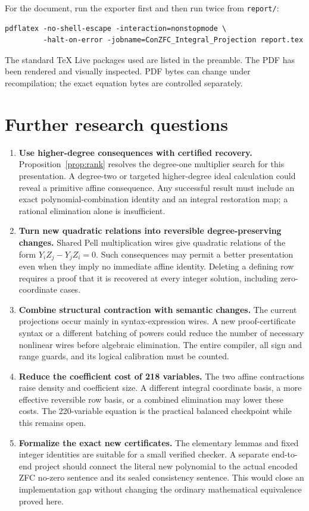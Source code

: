\documentclass[10pt,letterpaper]{article}
\theoremstyle{definition}\newtheorem{definition}[theorem]{Definition}
\begin{document}
For the document, run the exporter first and then run twice from
\texttt{report/}:
\begin{verbatim}
pdflatex -no-shell-escape -interaction=nonstopmode \
         -halt-on-error -jobname=ConZFC_Integral_Projection report.tex
\end{verbatim}
The standard TeX Live packages used are listed in the preamble. The PDF
has been rendered and visually inspected. PDF bytes can change under
recompilation; the exact equation bytes are controlled separately.

\section{Further research questions}
\label{sec:future}

\begin{enumerate}
\item \textbf{Use higher-degree consequences with certified recovery.}
Proposition~\ref{prop:rank} resolves the degree-one multiplier search for
this presentation. A degree-two or targeted higher-degree ideal calculation
could reveal a primitive affine consequence. Any successful result must
include an exact polynomial-combination identity and an integral restoration
map; a rational elimination alone is insufficient.

\item \textbf{Turn new quadratic relations into reversible degree-preserving
changes.} Shared Pell multiplication wires give quadratic relations of the
form $Y_iZ_j-Y_jZ_i=0$. Such consequences may permit a better presentation
even when they imply no immediate affine identity. Deleting a defining row
requires a proof that it is recovered at every integer solution, including
zero-coordinate cases.

\item \textbf{Combine structural contraction with semantic changes.}
The current projections occur mainly in syntax-expression wires. A new
proof-certificate syntax or a different batching of powers could reduce the
number of necessary nonlinear wires before algebraic elimination. The
entire compiler, all sign and range guards, and its logical calibration
must be counted.

\item \textbf{Reduce the coefficient cost of 218 variables.}
The two affine contractions raise density and coefficient size. A different
integral coordinate basis, a more effective reversible row basis, or a
combined elimination may lower these costs. The 220-variable equation is
the practical balanced checkpoint while this remains open.

\item \textbf{Formalize the exact new certificates.}
The elementary lemmas and fixed integer identities are suitable for a small
verified checker. A separate end-to-end project should connect the literal
new polynomial to the actual encoded ZFC no-zero sentence and its sealed
consistency sentence. This would close an implementation gap without
changing the ordinary mathematical equivalence proved here.
\end{enumerate}
\end{document}
